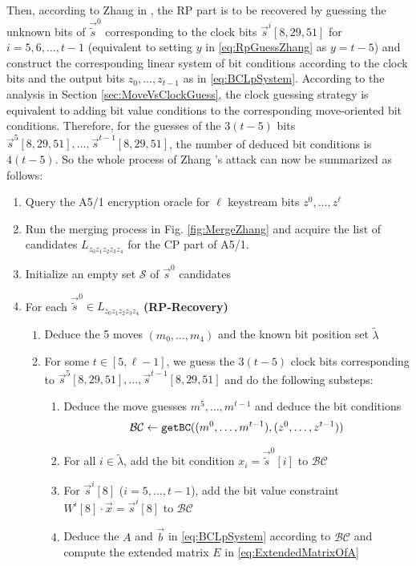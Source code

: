 Then, according to Zhang \etal in \cite{AC:Zhang19}, the RP part is to be recovered by guessing the unknown bits of $\vec{\tilde{s}}^0$ corresponding to the clock bits $\vec{s}^i[8,29,51]$ for $i=5,6,\ldots, t-1$ (equivalent to setting $y$ in \eqref{eq:RpGuessZhang} as $y=t-5$) and construct the corresponding linear system of bit conditions according to the clock bits and the output bits $z_0,\ldots, z_{t-1}$ as in \eqref{eq:BCLpSystem}.
According to the analysis in Section \ref{sec:MoveVsClockGuess}, the clock guessing strategy is equivalent to adding bit value conditions to the corresponding move-oriented bit conditions.
Therefore, for the guesses of the $3(t-5)$ bits $\vec{s}^5[8,29,51], \ldots, \vec{s}^{t-1}[8,29,51]$, the number of deduced bit conditions is $4(t-5)$.
So the whole process of Zhang \etal's attack can now be summarized as follows:
\begin{enumerate}
  \item Query the A5/1 encryption oracle for $\ell$ keystream bits $z^0,\ldots, z^{\ell}$
  \item Run the merging process in Fig. \ref{fig:MergeZhang} and acquire the list of candidates $L_{z_0z_1z_2z_3z_4}$ for the CP part of A5/1.
   \item Initialize an empty set $\mathcal{S}$ of $\vec{s}^0$ candidates
   \item For each $\vec{\tilde{s}}^0\in L_{z_0z_1z_2z_3z_4}$ \textbf{(RP-Recovery)}
   \begin{enumerate}
     \item Deduce the 5 moves $(m_0,\ldots, m_4)$ and the known bit position set $\tilde{\lambda}$
     \item For some $t \in [5,\ell-1]$, we guess the $3(t-5)$ clock bits corresponding to $\vec{s}^5[8,29,51], \ldots, \vec{s}^{t-1}[8,29,51]$ and do the following substeps:
     \begin{enumerate}
     \item Deduce the move guesses $m^5,\ldots, m^{t-1}$ and deduce the bit conditions
     \[
     \mathcal{BC}\leftarrow {\tt getBC}((m^0,\ldots, m^{t-1}), (z^0,\ldots, z^{t-1}))
     \]
     \item For all $i\in \tilde{\lambda}$, add the bit condition $x_i=\vec{\tilde{s}}^0[i]$ to $\mathcal{BC}$
     \item For $\vec{s}^i[8]$ ($i=5,\ldots, t-1$), add the bit value constraint $W^{i}[8]\cdot \vec{x}=\vec{s}^i[8]$ to $\mathcal{BC}$
     \item Deduce the $A$ and $\vec b$ in \eqref{eq:BCLpSystem} according to $\mathcal{BC}$ and compute the extended matrix $E$ in \eqref{eq:ExtendedMatrixOfA}

\end{enumerate}
\end{enumerate}
\end{enumerate}
